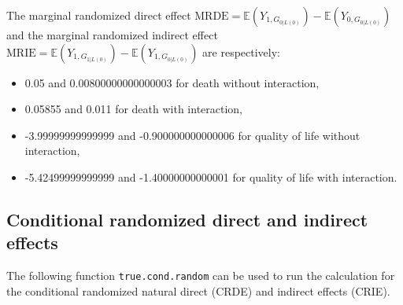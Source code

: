 \documentclass[
]{book}
\providecommand{\tightlist}{%
  \setlength{\itemsep}{0pt}\setlength{\parskip}{0pt}}
\begin{document}
The marginal randomized direct effect \(\text{MRDE}=\mathbb{E}\left(Y_{1,G_{0|L(0)}}\right) - \mathbb{E}\left(Y_{0,G_{0|L(0)}}\right)\) and the marginal randomized indirect effect \(\text{MRIE}=\mathbb{E}\left(Y_{1,G_{1|L(0)}}\right) - \mathbb{E}\left(Y_{1,G_{0|L(0)}}\right)\) are respectively:

\begin{itemize}
\tightlist
\item
  0.05 and 0.00800000000000003 for death without interaction,
\item
  0.05855 and 0.011 for death with interaction,
\item
  -3.99999999999999 and -0.900000000000006 for quality of life without interaction,
\item
  -5.42499999999999 and -1.40000000000001 for quality of life with interaction.
\end{itemize}

\subsection{Conditional randomized direct and indirect effects}\label{conditional-randomized-direct-and-indirect-effects}

The following function \texttt{true.cond.random} can be used to run the calculation for the conditional randomized natural direct (CRDE) and indirect effects (CRIE).
\end{document}
